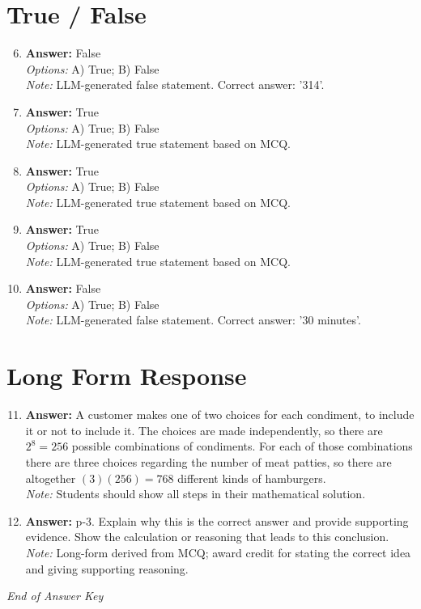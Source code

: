 \documentclass[12pt]{article}
\begin{document}
\section*{True / False}
\begin{enumerate}[label=\arabic*.]
\setcounter{enumi}{5}
\item \textbf{Answer:} False
\\ \textit{Options:} A) True; B) False
\\ \textit{Note:} LLM-generated false statement. Correct answer: '314'.
\item \textbf{Answer:} True
\\ \textit{Options:} A) True; B) False
\\ \textit{Note:} LLM-generated true statement based on MCQ.
\item \textbf{Answer:} True
\\ \textit{Options:} A) True; B) False
\\ \textit{Note:} LLM-generated true statement based on MCQ.
\item \textbf{Answer:} True
\\ \textit{Options:} A) True; B) False
\\ \textit{Note:} LLM-generated true statement based on MCQ.
\item \textbf{Answer:} False
\\ \textit{Options:} A) True; B) False
\\ \textit{Note:} LLM-generated false statement. Correct answer: '30 minutes'.
\end{enumerate}

\section*{Long Form Response}
\begin{enumerate}[label=\arabic*.]
\setcounter{enumi}{10}
\item \textbf{Answer:} A customer makes one of two choices for each condiment, to include it or not to include it. The choices are made independently, so there are $2^8 = 256$ possible combinations of condiments. For each of those combinations there are three choices regarding the number of meat patties, so there are altogether $(3)(256)=\boxed{768}$ different kinds of hamburgers.
\\ \textit{Note:} Students should show all steps in their mathematical solution.
\item \textbf{Answer:} p-3. Explain why this is the correct answer and provide supporting evidence. Show the calculation or reasoning that leads to this conclusion.
\\ \textit{Note:} Long-form derived from MCQ; award credit for stating the correct idea and giving supporting reasoning.
\end{enumerate}

\vfill
\noindent\textit{End of Answer Key}
\end{document}
